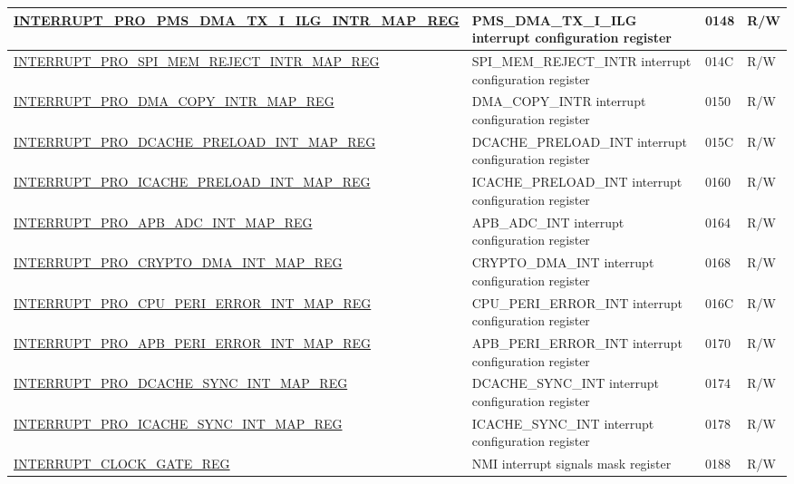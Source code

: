 \begin{longtable}{ | m{9.3cm} | m{9.2cm} | m{1.3cm} | m{1.2cm} | }
\hyperref[regdesc:INTERRUPTPROPMSDMATXIILGINTRMAPREG]{INTERRUPT\_PRO\_PMS\_DMA\_TX\_I\_ILG\_INTR\_MAP\_REG} & PMS\_DMA\_TX\_I\_ILG interrupt configuration register & \hexprefix{}0148 & R/W \\ \hline
\hyperref[regdesc:INTERRUPTPROSPIMEMREJECTINTRMAPREG]{INTERRUPT\_PRO\_SPI\_MEM\_REJECT\_INTR\_MAP\_REG} & SPI\_MEM\_REJECT\_INTR interrupt configuration register & \hexprefix{}014C & R/W \\ \hline
\hyperref[regdesc:INTERRUPTPRODMACOPYINTRMAPREG]{INTERRUPT\_PRO\_DMA\_COPY\_INTR\_MAP\_REG} & DMA\_COPY\_INTR interrupt configuration register & \hexprefix{}0150 & R/W \\ \hline
\hyperref[regdesc:INTERRUPTPRODCACHEPRELOADINTMAPREG]{INTERRUPT\_PRO\_DCACHE\_PRELOAD\_INT\_MAP\_REG} & DCACHE\_PRELOAD\_INT interrupt configuration register & \hexprefix{}015C & R/W \\ \hline
\hyperref[regdesc:INTERRUPTPROICACHEPRELOADINTMAPREG]{INTERRUPT\_PRO\_ICACHE\_PRELOAD\_INT\_MAP\_REG} & ICACHE\_PRELOAD\_INT interrupt configuration register & \hexprefix{}0160 & R/W \\ \hline
\hyperref[regdesc:INTERRUPTPROAPBADCINTMAPREG]{INTERRUPT\_PRO\_APB\_ADC\_INT\_MAP\_REG} & APB\_ADC\_INT interrupt configuration register & \hexprefix{}0164 & R/W \\ \hline
\hyperref[regdesc:INTERRUPTPROCRYPTODMAINTMAPREG]{INTERRUPT\_PRO\_CRYPTO\_DMA\_INT\_MAP\_REG} & CRYPTO\_DMA\_INT interrupt configuration register & \hexprefix{}0168 & R/W \\ \hline
\hyperref[regdesc:INTERRUPTPROCPUPERIERRORINTMAPREG]{INTERRUPT\_PRO\_CPU\_PERI\_ERROR\_INT\_MAP\_REG} & CPU\_PERI\_ERROR\_INT interrupt configuration register & \hexprefix{}016C & R/W \\ \hline
\hyperref[regdesc:INTERRUPTPROAPBPERIERRORINTMAPREG]{INTERRUPT\_PRO\_APB\_PERI\_ERROR\_INT\_MAP\_REG} & APB\_PERI\_ERROR\_INT interrupt configuration register & \hexprefix{}0170 & R/W \\ \hline
\hyperref[regdesc:INTERRUPTPRODCACHESYNCINTMAPREG]{INTERRUPT\_PRO\_DCACHE\_SYNC\_INT\_MAP\_REG} & DCACHE\_SYNC\_INT interrupt configuration register & \hexprefix{}0174 & R/W \\ \hline
\hyperref[regdesc:INTERRUPTPROICACHESYNCINTMAPREG]{INTERRUPT\_PRO\_ICACHE\_SYNC\_INT\_MAP\_REG} & ICACHE\_SYNC\_INT interrupt configuration register & \hexprefix{}0178 & R/W \\ \hline
\hyperref[regdesc:INTERRUPTCLOCKGATEREG]{INTERRUPT\_CLOCK\_GATE\_REG} & NMI interrupt signals mask register & \hexprefix{}0188 & R/W \\ \hline

\end{longtable}

